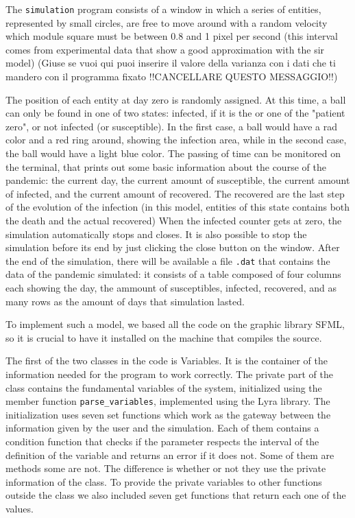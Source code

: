 \documentclass[a4paper, 11pt]{article}
\begin{document}
  The \verb|simulation| program consists of a window in which a series of entities, represented by small circles, are free to move around with a random velocity which module square must be between 0.8 and 1 pixel per second (this interval comes from experimental data that show a good approximation with the sir model) (Giuse se vuoi qui puoi inserire il valore della varianza con i dati che ti mandero con il programma fixato !!CANCELLARE QUESTO MESSAGGIO!!)

  The position of each entity at day zero is randomly assigned. At this time, a ball can only be found in one of two states: infected, if it is the or one of the "patient zero", or not infected (or susceptible). In the first case, a ball would have a rad color and a red ring around, showing the infection area, while in the second case, the ball would have a light blue color. The passing of time can be monitored on the terminal, that prints out some basic information about the course of the pandemic: the current day, the current amount of susceptible, the current amount of infected, and the current amount of recovered. The recovered are the last step of the evolution of the infection (in this model, entities of this state contains both the death and the actual recovered) When the infected counter gets at zero, the simulation automatically stops and closes. It is also possible to stop the simulation before its end by just clicking the close button on the window. After the end of the simulation, there will be available a file \verb|.dat| that contains the data of the pandemic simulated: it consists of a table composed of four columns each showing the day, the ammount of susceptibles, infected, recovered, and as many rows as the amount of days that simulation lasted.

  To implement such a model, we based all the code on the graphic library SFML, so it is crucial to have it installed on the machine that compiles the source.

  The first of the two classes in the code is Variables. It is the container of the information needed for the program to work correctly. The private part of the class contains the fundamental variables of the system, initialized using the member function \verb|parse_variables|, implemented using the Lyra library. The initialization uses seven set functions which work as the gateway between the information given by the user and the simulation. Each of them contains a condition function that checks if the parameter respects the interval of the definition of the variable and returns an error if it does not. Some of them are methods some are not. The difference is whether or not they use the private information of the class. To provide the private variables to other functions outside the class we also included seven get functions that return each one of the values.
\end{document}
